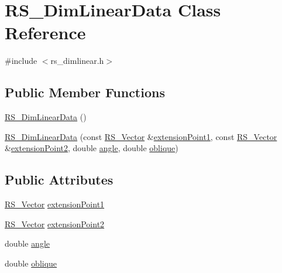 \hypertarget{classRS__DimLinearData}{\section{R\-S\-\_\-\-Dim\-Linear\-Data Class Reference}
\label{classRS__DimLinearData}
}


{\ttfamily \#include $<$rs\-\_\-dimlinear.\-h$>$}

\subsection*{Public Member Functions}
\begin{DoxyCompactItemize}
\item 
\hyperlink{classRS__DimLinearData_a83a7e249cfb04e8b993d05734c2b0c2b}{R\-S\-\_\-\-Dim\-Linear\-Data} ()
\item 
\hyperlink{classRS__DimLinearData_a800b4b7c408cccf152be60f742fef5f6}{R\-S\-\_\-\-Dim\-Linear\-Data} (const \hyperlink{classRS__Vector}{R\-S\-\_\-\-Vector} \&\hyperlink{classRS__DimLinearData_a7f424f8b4579d701d8c056ddcb7bb01b}{extension\-Point1}, const \hyperlink{classRS__Vector}{R\-S\-\_\-\-Vector} \&\hyperlink{classRS__DimLinearData_ac4728ec01a1db5bcdc5666f138e82f83}{extension\-Point2}, double \hyperlink{classRS__DimLinearData_adf69c492012326e50f4cafe9c112e0f3}{angle}, double \hyperlink{classRS__DimLinearData_a2c6e039d704b4343a3b4392d81490797}{oblique})
\end{DoxyCompactItemize}
\subsection*{Public Attributes}
\begin{DoxyCompactItemize}
\item 
\hyperlink{classRS__Vector}{R\-S\-\_\-\-Vector} \hyperlink{classRS__DimLinearData_a7f424f8b4579d701d8c056ddcb7bb01b}{extension\-Point1}
\item 
\hyperlink{classRS__Vector}{R\-S\-\_\-\-Vector} \hyperlink{classRS__DimLinearData_ac4728ec01a1db5bcdc5666f138e82f83}{extension\-Point2}
\item 
double \hyperlink{classRS__DimLinearData_adf69c492012326e50f4cafe9c112e0f3}{angle}
\item 
double \hyperlink{classRS__DimLinearData_a2c6e039d704b4343a3b4392d81490797}{oblique}
\end{DoxyCompactItemize}
